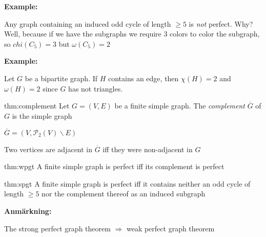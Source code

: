 \par\bigskip
\noindent\textbf{Example:}\par
\noindent Any graph containing an induced odd cycle of length $\geq5$ is \textit{not} perfect. Why? Well, because if we have the subgraphs we require 3 colors to color the subgraph, so $chi(C_5) =3$ but $\omega(C_5)=2$ 
\par\bigskip
\noindent\textbf{Example:}\par
\noindent Let $G$ be a bipartite graph. If $H$ contains an edge, then $\chi(H) = 2$  and $\omega(H) = 2$ since $G$ has not triangles.
\par\bigskip
\begin{theo}[Complement]{thm:complement}
  Let $G = (V,E)$ be a finite simple graph. The \textit{complement} $\overline{G}$ of $G$ is the simple graph\par\noindent$\overline{G} = (V,\mathcal{P}_2(V)\backslash E)$
  \par\bigskip
  \noindent Two vertices are adjacent in $\overline{G}$ iff they were non-adjacent in $G$
\end{theo}
\par\bigskip
\begin{theo}{thm:wpgt}
  A finite simple graph is perfect iff its complement is perfect
\end{theo}
\newpage
\begin{theo}{thm:spgt}
  A finite simple graph is perfect iff it contains neither an odd cycle of length $\geq5$ nor the complement thereof as an induced subgraph
\end{theo}
\par\bigskip
\noindent\textbf{Anmärkning:}\par
\noindent The strong perfect graph theorem $\Rightarrow$ weak perfect graph theorem
